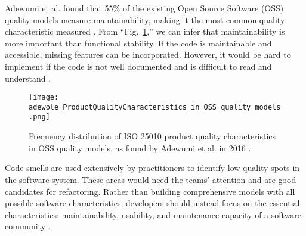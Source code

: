 Adewumi et al. found that 55\% of the existing Open Source Software (OSS) quality models measure maintainability, making it the most common quality characteristic measured \cite{adewumi:2016}. From ``Fig.~\ref{figFreqDistProductQualityModel},'' we can infer that maintainability is more important than functional stability. If the code is maintainable and accessible, missing features can be incorporated. However, it would be hard to implement if the code is not well documented and is difficult to read and understand \cite{adewumi:2016}.

\begin{figure}[ht]
  \centerline{
      \texttt{[image: adewole\_ProductQualityCharacteristics\_in\_OSS\_quality\_models.png]}
  }
  \caption{Frequency distribution of ISO 25010 product quality characteristics in OSS quality models, as found by Adewumi et al. in 2016 \cite{adewumi:2016}.}
  \label{figFreqDistProductQualityModel}
\end{figure}

Code smells are used extensively by practitioners to identify low-quality spots in the software system. These areas would need the teams' attention and are good candidates for refactoring. Rather than building comprehensive models with all possible software characteristics, developers should instead focus on the essential characteristics: maintainability, usability, and maintenance capacity of a software community \cite{adewumi:2016}.
